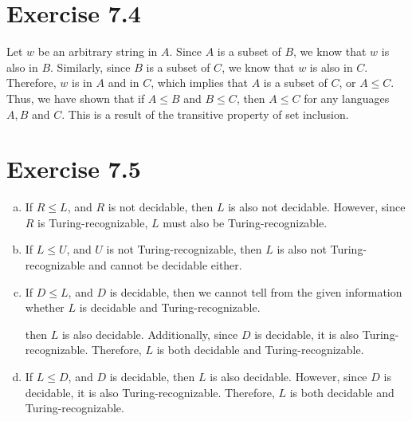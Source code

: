 \documentclass{article} %
\newcommand{\homeworkNumber}{7}
\begin{document}
\section*{Exercise \homeworkNumber.4}
Let $w$ be an arbitrary string in $A$. Since $A$ is a subset of $B$, we know that $w$ is also in $B$. Similarly, since $B$ is a subset of $C$, we know that $w$ is also in $C$. Therefore, $w$ is in $A$ and in $C$, which implies that $A$ is a subset of $C$, or $A \le C$.\\
Thus, we have shown that if $A \le B$ and $B \le C$, then $A \le C$ for any languages $A, B$ and $C$. This is a result of the transitive property of set inclusion.

\section*{Exercise \homeworkNumber.5}
\begin{enumerate}[(a)]
\item
If $R \le L$, and $R$ is not decidable, then $L$ is also not decidable. However, since $R$ is Turing-recognizable, $L$ must also be Turing-recognizable.
\item
If $L \le U$, and $U$ is not Turing-recognizable, then $L$ is also not Turing-recognizable and cannot be decidable either.
\item
If $D \le L$, and $D$ is decidable, then we cannot tell from the given information whether $L$ is decidable and Turing-recognizable.

then $L$ is also decidable. Additionally, since $D$ is decidable, it is also Turing-recognizable. Therefore, $L$ is both decidable and Turing-recognizable.
\item
If $L \le D$, and $D$ is decidable, then $L$ is also decidable. However, since $D$ is decidable, it is also Turing-recognizable. Therefore, $L$ is both decidable and Turing-recognizable.
\end{enumerate}
\end{document}
